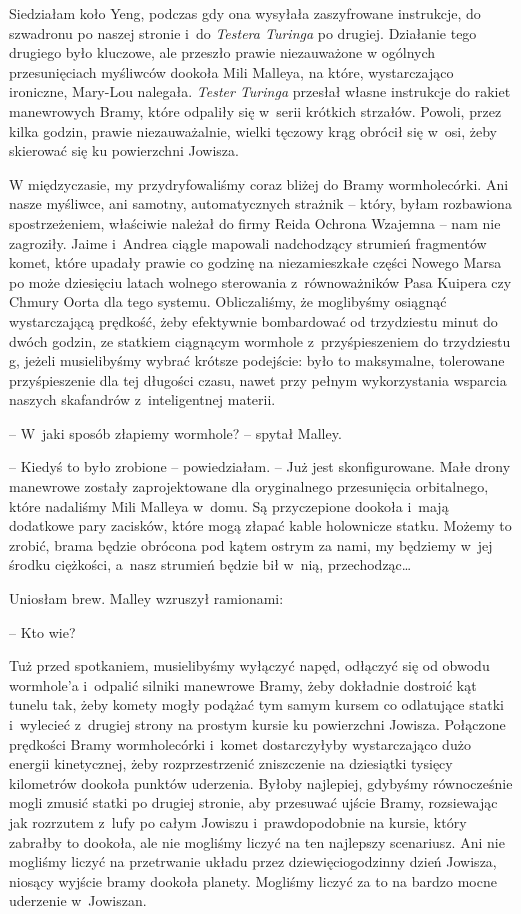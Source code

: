 \documentclass[oneside,polish,11pt,sfheadings]{mwbk}
\begin{document}
Siedziałam koło Yeng, podczas gdy ona wysyłała zaszyfrowane instrukcje,
do szwadronu po naszej stronie i~do \textit{Testera Turinga} po drugiej.
Działanie tego drugiego było kluczowe, ale przeszło prawie niezauważone
w ogólnych przesunięciach myśliwców dookoła Mili Malleya, na które,
wystarczająco ironiczne, Mary-Lou nalegała. \textit{Tester Turinga}
przesłał własne instrukcje do rakiet manewrowych Bramy, które odpaliły
się w~serii krótkich strzałów. Powoli, przez kilka godzin, prawie
niezauważalnie, wielki tęczowy krąg obrócił się w~osi, żeby skierować
się ku powierzchni Jowisza.

W międzyczasie, my przydryfowaliśmy coraz bliżej do Bramy
wormhole\dywiz córki. Ani nasze myśliwce, ani samotny, automatycznych strażnik
-- który, byłam rozbawiona spostrzeżeniem, właściwie należał do firmy
Reida Ochrona Wzajemna -- nam nie zagroziły. Jaime i~Andrea ciągle
mapowali nadchodzący strumień fragmentów komet, które upadały prawie co
godzinę na niezamieszkałe części Nowego Marsa po może dziesięciu latach
wolnego sterowania z~równoważników Pasa Kuipera czy Chmury Oorta dla
tego systemu. Obliczaliśmy, że moglibyśmy osiągnąć wystarczającą
prędkość, żeby efektywnie bombardować od trzydziestu minut do dwóch
godzin, ze statkiem ciągnącym wormhole z~przyśpieszeniem do trzydziestu
g, jeżeli musielibyśmy wybrać krótsze podejście: było to maksymalne,
tolerowane przyśpieszenie dla tej długości czasu, nawet przy pełnym
wykorzystania wsparcia naszych skafandrów z~inteligentnej materii.

-- W~jaki sposób złapiemy wormhole? -- spytał Malley.

-- Kiedyś to było zrobione -- powiedziałam. -- Już jest skonfigurowane.
Małe drony manewrowe zostały zaprojektowane dla oryginalnego
przesunięcia orbitalnego, które nadaliśmy Mili Malleya w~domu. Są
przyczepione dookoła i~mają dodatkowe pary zacisków, które mogą złapać
kable holownicze statku. Możemy to zrobić, brama będzie obrócona pod
kątem ostrym za nami, my będziemy w~jej środku ciężkości, a~nasz
strumień będzie bił w~nią, przechodząc\ldots 

Uniosłam brew. Malley wzruszył ramionami: 

-- Kto wie?

Tuż przed spotkaniem, musielibyśmy wyłączyć napęd, odłączyć się od
obwodu wormhole'a i~odpalić silniki manewrowe Bramy, żeby dokładnie
dostroić kąt tunelu tak, żeby komety mogły podążać tym samym kursem co
odlatujące statki i~wylecieć z~drugiej strony na prostym kursie ku
powierzchni Jowisza. Połączone prędkości Bramy wormhole\dywiz córki i~komet
dostarczyłyby wystarczająco dużo energii kinetycznej, żeby
rozprzestrzenić zniszczenie na dziesiątki tysięcy kilometrów dookoła
punktów uderzenia. Byłoby najlepiej, gdybyśmy równocześnie mogli zmusić
statki po drugiej stronie, aby przesuwać ujście Bramy, rozsiewając jak
rozrzutem z~lufy po całym Jowiszu i~prawdopodobnie na kursie, który
zabrałby to dookoła, ale nie mogliśmy liczyć na ten najlepszy
scenariusz. Ani nie mogliśmy liczyć na przetrwanie układu przez
dziewięciogodzinny dzień Jowisza, niosący wyjście bramy dookoła planety.
Mogliśmy liczyć za to na bardzo mocne uderzenie w~Jowiszan.
\end{document}
